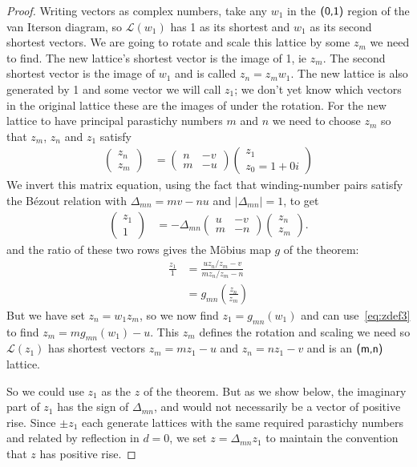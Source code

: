 \begin{proof}
Writing vectors as complex numbers, take any $w_1$ in the  $\textsf{(0,1)}$ region of the van Iterson diagram, so $\mathcal{L}(w_1)$ has 1 as its shortest and $w_1$ as its second shortest vectors. We are going to rotate and scale this lattice by some $z_m$ we need to find. The new lattice's shortest vector is the image of 1, ie $z_m$. The second shortest vector is the image of $w_1$ and is called $z_n=z_m w_1$. The new lattice is also  generated by 1 and some vector we will call $z_1$; we don't yet know which vectors in the original lattice these are the images of under the rotation.  For the new lattice to have principal parastichy numbers $m$ and $n$ we need to choose $z_m$ so that $z_m$, $z_n$  and $z_1$ satisfy
	\begin{align}
		\begin{pmatrix}
			z_n \\ z_m 
		\end{pmatrix}
		&=
		\begin{pmatrix}
			n  & -v\\ m & -u
		\end{pmatrix}
		\begin{pmatrix}
			z_1 \\ z_0=1 +0i
		\end{pmatrix}
		\label{eq:zdef3}
	\end{align}
  We invert this matrix equation, using the fact that 
  winding-number pairs satisfy the B\'ezout relation with
  $\Delta_{mn}=mv-nu$ and $|\Delta_{mn}|=1$, to get
\begin{align}
\begin{pmatrix}
	z_1 \\ 1 
\end{pmatrix}
&= -\Delta_{mn} \begin{pmatrix}
	u & -v\\ m & -n
\end{pmatrix}
 \begin{pmatrix}
	z_n \\ z_m 
\end{pmatrix}.
\label{eq:zinv}
\end{align}
and the ratio of these two rows gives the M\"obius map $g$ of the theorem: 
\begin{align}
\frac{z_1}{1}&= \frac{ u z_n/z_m - v}{m z_n/z_m - n}
\\
&= g_{mn} \left(\frac{z_n}{z_m}\right)\label{eq:gmnzmn}
\end{align}
But we have set $z_n=w_1 z_m$, so we now find $z_1=g_{mn}(w_1)$ and can use~\eqref{eq:zdef3} to find $z_m=m g_{mn}(w_1)-u$. This $z_m$ defines the rotation and scaling we need so  $\mathcal{L}(z_1)$ has shortest vectors $z_m=mz_1-u$ and $z_n= n z_1-v$ and is an $\textsf{(m,n)}$ lattice.  

So we could use $z_1$ as the $z$ of the theorem. But as we show below, the imaginary part of $z_1$ has the sign of $\Delta_{mn}$, and would not necessarily be a vector of positive rise. Since  $\pm z_1$ each generate lattices with the same required parastichy numbers and related by reflection in $d=0$, we set $z=\Delta_{mn}z_1$ to maintain the convention that $z$ has positive rise. 



\end{proof}
